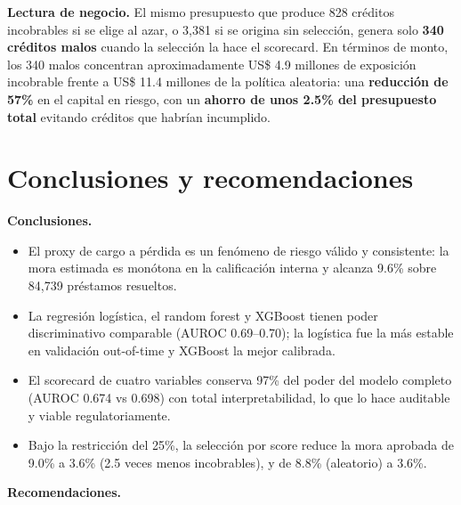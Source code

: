 \documentclass[11pt, letterpaper]{article}
\newcommand{\bt}[1]{\textbf{#1}}
\begin{document}
\textbf{Lectura de negocio.} El mismo presupuesto que produce 828 créditos
incobrables si se elige al azar, o 3,381 si se origina sin selección, genera
solo \bt{340 créditos malos} cuando la selección la hace el scorecard. En
términos de monto, los 340 malos concentran aproximadamente
US\$ 4.9 millones de exposición incobrable frente a US\$ 11.4 millones de la
política aleatoria: una \bt{reducción de 57\%} en el capital en riesgo, con un
\bt{ahorro de unos 2.5\% del presupuesto total} evitando créditos que
habrían incumplido.

\section{Conclusiones y recomendaciones}

\textbf{Conclusiones.}

\begin{itemize}[leftmargin=2em]
  \item El proxy de cargo a pérdida es un fenómeno de riesgo válido y
        consistente: la mora estimada es monótona en la calificación interna
        y alcanza 9.6\% sobre 84,739 préstamos resueltos.
  \item La regresión logística, el random forest y XGBoost tienen poder
        discriminativo comparable (AUROC 0.69--0.70); la logística fue la más
        estable en validación out-of-time y XGBoost la mejor calibrada.
  \item El scorecard de cuatro variables conserva 97\% del poder del modelo
        completo (AUROC 0.674 vs 0.698) con total interpretabilidad, lo que
        lo hace auditable y viable regulatoriamente.
  \item Bajo la restricción del 25\%, la selección por score reduce la mora
        aprobada de 9.0\% a 3.6\% (2.5 veces menos incobrables), y de 8.8\%
        (aleatorio) a 3.6\%.
\end{itemize}

\textbf{Recomendaciones.}
\end{document}
